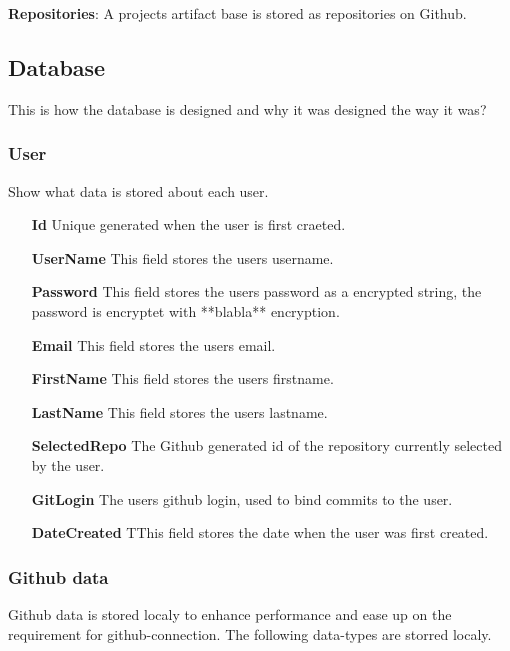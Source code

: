 \textbf{Repositories}:
A projects artifact base is stored as repositories on Github.

\subsection{Database}

This is how the database is designed and why it was designed the way it was?

\subsubsection*{User}
Show what data is stored about each user.
\vspace{0.5cm}
\begin{itemize}
    \item[\textbf{Id}]{Unique generated when the user is first craeted.}
    \item[\textbf{UserName}]{This field stores the users username.}
    \item[\textbf{Password}]{This field stores the users password as a encrypted string, the password is encryptet with **blabla** encryption.}
    \item[\textbf{Email}]{This field stores the users email.}
    \item[\textbf{FirstName}]{This field stores the users firstname.}
    \item[\textbf{LastName}]{This field stores the users lastname.}
    \item[\textbf{SelectedRepo}]{The Github generated id of the repository currently selected by the user.}
    \item[\textbf{GitLogin}]{The users github login, used to bind commits to the user.}
    \item[\textbf{DateCreated}]{TThis field stores the date when the user was first created.}
\end{itemize}
\vspace{0.5cm}

\subsubsection{Github data}
Github data is stored localy to enhance performance and ease up on the requirement for github-connection. The following data-types are storred localy.

